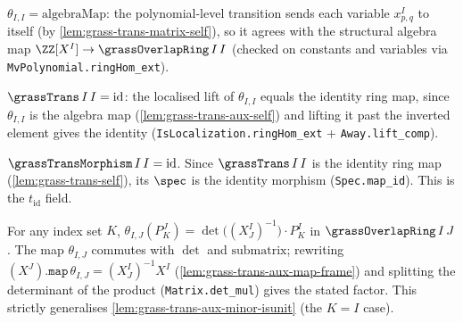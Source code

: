 \begin{lemma}

  \label{lem:grass-trans-aux-self}
  $\theta_{I,I} = \mathrm{algebraMap}$: the polynomial-level transition sends each
  variable $x^I_{p,q}$ to itself (by \cref{lem:grass-trans-matrix-self}), so it
  agrees with the structural algebra map $\ZZ[X^I]\to\grassOverlapRing\,I\,I$
  (checked on constants and variables via \texttt{MvPolynomial.ringHom\_ext}).
\end{lemma}

\begin{lemma}

  \label{lem:grass-trans-self}
  $\grassTrans\,I\,I = \mathrm{id}$: the localised lift of $\theta_{I,I}$ equals
  the identity ring map, since $\theta_{I,I}$ is the algebra map
  (\cref{lem:grass-trans-aux-self}) and lifting it past the inverted element gives
  the identity (\texttt{IsLocalization.ringHom\_ext} + \texttt{Away.lift\_comp}).
\end{lemma}

\begin{lemma}

  \label{lem:grass-trans-morphism-self}
  $\grassTransMorphism\,I\,I = \mathrm{id}$. Since $\grassTrans\,I\,I$ is the
  identity ring map (\cref{lem:grass-trans-self}), its $\spec$ is the identity
  morphism (\texttt{Spec.map\_id}). This is the $t_{\mathrm{id}}$ field.
\end{lemma}

\begin{lemma}

  \label{lem:grass-trans-aux-minor}
  For any index set $K$, $\theta_{I,J}(P^J_K) = \det\big((X^I_J)^{-1}\big)\cdot
  P^I_K$ in $\grassOverlapRing\,I\,J$. The map $\theta_{I,J}$ commutes with
  $\det$ and $\mathrm{submatrix}$; rewriting $(X^J).\mathtt{map}\,\theta_{I,J} =
  (X^I_J)^{-1}X^I$ (\cref{lem:grass-trans-aux-map-frame}) and splitting the
  determinant of the product (\texttt{Matrix.det\_mul}) gives the stated factor.
  This strictly generalises \cref{lem:grass-trans-aux-minor-isunit} (the $K=I$
  case).
\end{lemma}

